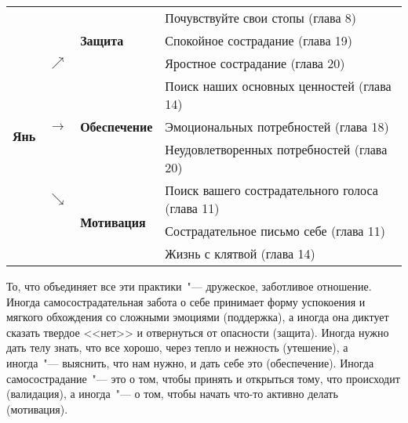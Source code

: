 \begin{table}[!h]
	\begin{center}
		\setlength{\extrarowheight}{1mm}
		\begin{tabular}{p{1.2cm}p{3mm}p{2.6cm}||p{9.5cm}}
			\cline{3-4}
			\multirow{9}{*}{{\LARGE\textbf{Янь}}} &  & \multirow{3}{*}{\textbf{Защита}} & {\small Почувствуйте свои стопы (глава 8)} \\ 
			&  &  & {\small Спокойное сострадание (глава 19)}\\ 
			& $\nearrow$ &  & {\small Яростное сострадание (глава 20)}\\ \cline{3-4}
			& \multirow{3}{*}{\textbf{$\rightarrow$}} & \multirow{3}{*}{\textbf{Обеспечение}} & {\small Поиск наших основных ценностей (глава 14)}\\
			&   &   & {\small Эмоциональных потребностей} (глава 18)\\
			&   &   & {\small Неудовлетворенных потребностей (глава 20)}\\ \cline{3-4}
			& $\searrow$ & \multirow{3}{*}{\textbf{Мотивация}} & {\small Поиск вашего сострадательного голоса (глава 11)}\\
			&   &   & {\small Сострадательное письмо себе (глава 11)}\\
			&   &   & {\small Жизнь с клятвой (глава 14)}\\ \cline{3-4}
		\end{tabular}
		\setlength{\extrarowheight}{0mm}
	\end{center}
\end{table} 

То, что объединяет все эти практики~"--- дружеское, заботливое отношение. Иногда самосострадательная забота о себе принимает форму успокоения и мягкого обхождения со сложными эмоциями (поддержка), а иногда она диктует сказать твердое <<нет>> и отвернуться от опасности (защита). Иногда нужно дать телу знать, что все хорошо, через тепло и нежность (утешение), а иногда~"--- выяснить, что нам нужно, и дать себе это (обеспечение). Иногда самосострадание~"--- это о том, чтобы принять и открыться тому, что происходит (валидация), а иногда~"--- о том, чтобы начать что-то активно делать (мотивация). 

